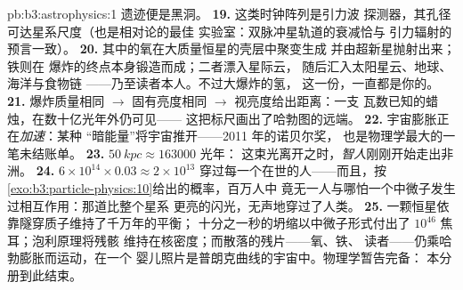 \begin{solution}{pb:b3:astrophysics:1}
遗迹便是黑洞。
\textbf{19.} 这类时钟阵列是引力波
探测器，其孔径可达星系尺度（也是相对论的最佳
实验室：双脉冲星轨道的衰减恰与
引力辐射的预言一致）。
\textbf{20.} 其中的氧在大质量恒星的壳层中聚变生成
并由超新星抛射出来；铁则在
爆炸的终点本身锻造而成；二者漂入星际云，
随后汇入太阳星云、地球、海洋与食物链
——乃至读者本人。不过大爆炸的氢，
这一份，一直都是你的。
\textbf{21.} 爆炸质量相同 $\to$ 固有亮度相同
$\to$ 视亮度给出距离：一支
瓦数已知的蜡烛，在数十亿光年外仍可见——
这把标尺画出了哈勃图的远端。
\textbf{22.} 宇宙膨胀正在\emph{加速}：某种
“暗能量”将宇宙推开——2011 年的诺贝尔奖，
也是物理学最大的一笔未结账单。
\textbf{23.} $\qty{50}{kpc} \approx 163000$ 光年：
这束光离开之时，\emph{智人}刚刚开始走出非洲。
\textbf{24.} $6\times10^{14}\times0.03 \approx 2\times10^{13}$
穿过每一个在世的人——而且，按
\cref{exo:b3:particle-physics:10}给出的概率，百万人中
竟无一人与哪怕一个中微子发生过相互作用：那道比整个星系
更亮的闪光，无声地穿过了人类。
\textbf{25.} 一颗恒星依靠隧穿质子维持了千万年的平衡；
十分之一秒的坍缩以中微子形式付出了 $10^{46}$
焦耳；泡利原理将残骸
维持在核密度；而散落的残片——氧、铁、
读者——仍乘哈勃膨胀而运动，在一个
婴儿照片是普朗克曲线的宇宙中。物理学暂告完备：
本分册到此结束。
\end{solution}
